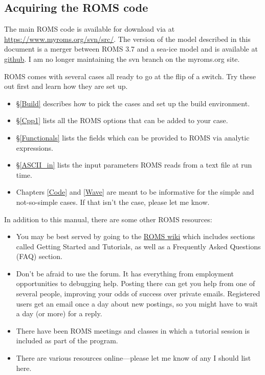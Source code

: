 \subsection{Acquiring the ROMS code}
The main ROMS code is available for download via  at
\url{https://www.myroms.org/svn/src/}. The version of the model
described in this document is a merger between ROMS 3.7 and a sea-ice
model and is available at
\href{https://github.com/kshedstrom/roms}{github}. I am no longer
maintaining the svn branch on the myroms.org site.

ROMS comes with several cases all ready to go at the flip
of a switch. Try these out first and learn how they are set up.
    \begin{itemize}
      \item \S\ref{Build} describes how to pick the cases and set up
      the build environment.
      \item \S\ref{Cpp1} lists all the ROMS options that can be
      added to your case.
      \item \S\ref{Functionals} lists the fields which can be
      provided to ROMS via analytic expressions.
      \item \S\ref{ASCII_in} lists the input parameters ROMS reads
      from a text file at run time.
      \item Chapters \ref{Code} and \ref{Wave} are meant to be
      informative for the simple and not-so-simple cases. If that
      isn't the case, please let me know.
    \end{itemize}
In addition to this manual, there are some other ROMS resources:
\begin{itemize}
   \item You may be best served by going to the 
\href{https://www.myroms.org/wiki/}{ROMS wiki} which includes
sections called Getting Started and Tutorials, as well as a Frequently
Asked Questions (FAQ) section.
   \item Don't be afraid to use the forum. It has everything from
employment opportunities to debugging help. Posting there can get
you help from one of several people, improving your odds of success
over private emails. Registered users get an email once a day about
new postings, so you might have to wait a day (or more) for a reply.
   \item There have been ROMS meetings and classes in which a tutorial
session is included as part of the program.
   \item There are various resources online---please let me know of any I
should list here.
\end{itemize}

